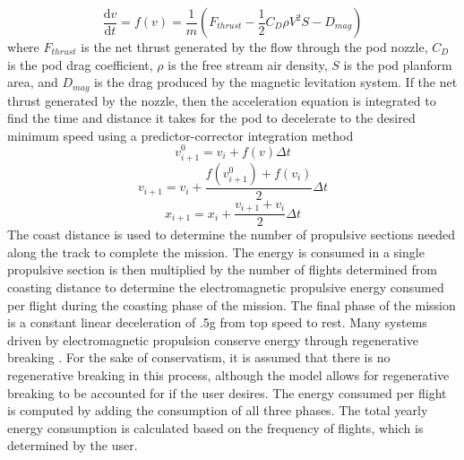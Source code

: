 	\begin{equation}
		\label{eq:acceleration}
		\frac{\mathrm{d} v}{\mathrm{d} t} = f ( v  ) = \frac{1}{m} ( F_{thrust} - \frac{1}{2}C_{D}\rho V^{2}S - D_{mag})
	\end{equation}
	where $F_{thrust}$ is the net thrust generated by the flow through the pod nozzle, $C_D$  is the pod drag coefficient, $\rho$ is the free stream air density, $S$ is the pod planform area, and $D_{mag}$ is the drag produced by the magnetic levitation system. If the net thrust generated by the nozzle, then the acceleration equation is integrated to find the time and distance it takes for the pod to decelerate to the desired minimum speed using a predictor-corrector integration method 
	\begin{equation}
		\label{eq:predictor_corrector}
		v_{i+1}^{0} = v_{i}+f(v)\Delta t
	\end{equation}	
	\begin{equation}
		\label{eq:predictor_corrector_2}
		v_{i+1} = v_{i}+\frac{f(v_{i+1}^{0})+f(v_{i})}{2}\Delta t
	\end{equation}	
	\begin{equation}
		\label{eq:predictor_corrector_3}
		x_{i+1} = x_{i}+\frac{v_{i+1}+v_{i}}{2}\Delta t
	\end{equation}	
	The coast distance is used to determine the number of propulsive sections needed along the track to complete the mission. The energy is consumed in a single propulsive section is then multiplied by the number of flights determined from coasting distance to determine the electromagnetic propulsive energy consumed per flight during the coasting phase of the mission. The final phase of the mission is a constant linear deceleration of .5g from top speed to rest. Many systems driven by electromagnetic propulsion conserve energy through regenerative breaking \cite{inductrack}. For the sake of conservatism, it is assumed that there is no regenerative breaking in this process, although the model allows for regenerative breaking to be accounted for if the user desires. The energy consumed per flight is computed by adding the consumption of all three phases. The total yearly energy consumption is calculated based on the frequency of flights, which is determined by the user.


